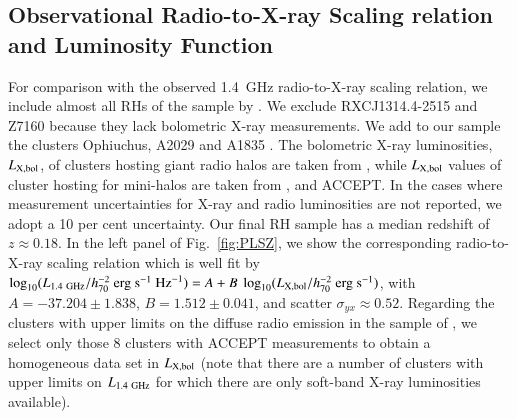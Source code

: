 \documentclass[useAMS,usenatbib]{mn2e}
\begin{document}
\begin{appendix}

\section{Observational Radio-to-X-ray Scaling relation and Luminosity Function}
\label{app:D}

For comparison with the observed 1.4~GHz radio-to-X-ray scaling relation, we
include almost all RHs of the sample by \cite{2011A&A...527A..99E}. 
We exclude RXCJ1314.4-2515 and Z7160 because they lack bolometric X-ray measurements. 
We add to our sample the clusters Ophiuchus, A2029 and A1835
\citep{2009A&A...499..371G}. The bolometric X-ray luminosities,
$L_{{\mathrm{X,bol}}}$, of clusters hosting giant radio halos are taken from
\cite{2009A&A...507..661B}, while $L_{{\mathrm{X,bol}}}$ values of cluster hosting
for mini-halos are taken from \cite{2002ApJ...567..716R},
\cite{Boehringer:1998vv} and ACCEPT. In the cases where measurement
uncertainties for X-ray and radio luminosities are not reported, we adopt a
10 per cent uncertainty. Our final RH sample has a median redshift of
$z\approx0.18$. In the left panel of Fig.~\ref{fig:PLSZ}, we show the
corresponding radio-to-X-ray scaling relation which is well fit by $\log_{10}
(L_{1.4~{\mathrm{GHz}}}/h_{70}^{-2}~{\mathrm{erg}}~{\mathrm{s}}^{-1}~{\mathrm{Hz}}^{-1}) = A +
B~\log_{10} (L_{{\mathrm{X,bol}}}/h_{70}^{-2}~{\mathrm{erg}}~{\mathrm{s}}^{-1})$, with
$A=-37.204\pm1.838$, $B=1.512\pm0.041$, and scatter $\sigma_{yx} \approx
0.52$. Regarding the clusters with upper limits on the diffuse radio emission in
the sample of \cite{2011A&A...527A..99E}, we select only those 8 clusters with
ACCEPT measurements to obtain a homogeneous data set in $L_{{\mathrm{X,bol}}}$ (note
that there are a number of clusters with upper limits on $L_{1.4~{\mathrm{GHz}}}$ for
which there are only soft-band X-ray luminosities available).


\end{appendix}
\end{document}
